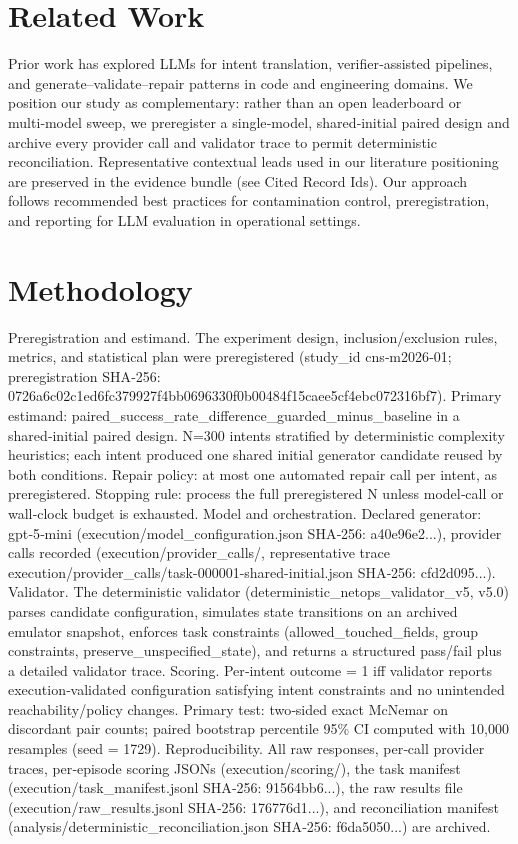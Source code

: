 \documentclass[conference]{IEEEtran}
\begin{document}
\section{Related Work}
Prior work has explored LLMs for intent translation, verifier‑assisted pipelines, and generate--validate--repair patterns in code and engineering domains. We position our study as complementary: rather than an open leaderboard or multi‑model sweep, we preregister a single‑model, shared‑initial paired design and archive every provider call and validator trace to permit deterministic reconciliation. Representative contextual leads used in our literature positioning are preserved in the evidence bundle (see Cited Record Ids). Our approach follows recommended best practices for contamination control, preregistration, and reporting for LLM evaluation in operational settings.

\section{Methodology}
Preregistration and estimand. The experiment design, inclusion/exclusion rules, metrics, and statistical plan were preregistered (study\_id cns‑m2026‑01; preregistration SHA‑256: 0726a6c02c1ed6fc379927f4bb0696330f0b00484f15caee5cf4ebc072316bf7). Primary estimand: paired\_success\_rate\_difference\_guarded\_minus\_baseline in a shared‑initial paired design. N=300 intents stratified by deterministic complexity heuristics; each intent produced one shared initial generator candidate reused by both conditions. Repair policy: at most one automated repair call per intent, as preregistered. Stopping rule: process the full preregistered N unless model‑call or wall‑clock budget is exhausted. Model and orchestration. Declared generator: gpt‑5‑mini (execution/model\_configuration.json SHA‑256: a40e96e2...), provider calls recorded (execution/provider\_calls/, representative trace execution/provider\_calls/task-000001-shared-initial.json SHA‑256: cfd2d095...). Validator. The deterministic validator (deterministic\_netops\_validator\_v5, v5.0) parses candidate configuration, simulates state transitions on an archived emulator snapshot, enforces task constraints (allowed\_touched\_fields, group constraints, preserve\_unspecified\_state), and returns a structured pass/fail plus a detailed validator trace. Scoring. Per‑intent outcome = 1 iff validator reports execution‑validated configuration satisfying intent constraints and no unintended reachability/policy changes. Primary test: two‑sided exact McNemar on discordant pair counts; paired bootstrap percentile 95\% CI computed with 10,000 resamples (seed = 1729). Reproducibility. All raw responses, per‑call provider traces, per‑episode scoring JSONs (execution/scoring/), the task manifest (execution/task\_manifest.jsonl SHA‑256: 91564bb6...), the raw results file (execution/raw\_results.jsonl SHA‑256: 176776d1...), and reconciliation manifest (analysis/deterministic\_reconciliation.json SHA‑256: f6da5050...) are archived.
\end{document}
